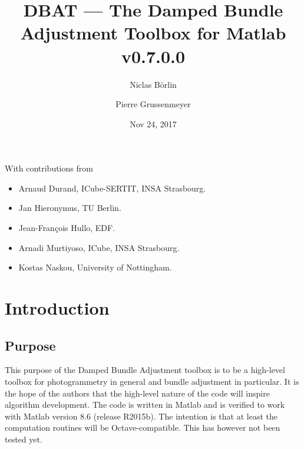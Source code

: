 \documentclass{article}
\begin{document}


\newcommand{\dbatversion}{0.7.0.0}
\newcommand{\dbatdate}{Nov 24, 2017}

\title{DBAT --- The Damped Bundle Adjustment Toolbox for Matlab\\\Large v\dbatversion{}}

\author[1]{Niclas B{\"o}rlin}
\author[2]{Pierre Grussenmeyer}
\date{\dbatdate}

\maketitle

\vfill
With contributions from
\begin{itemize}
\item Arnaud Durand, ICube-SERTIT, INSA Strasbourg.
\item Jan Hieronymus, TU Berlin.
\item Jean-Fran{\c{c}}ois Hullo, EDF.
\item Arnadi Murtiyoso, ICube, INSA Strasbourg.
\item Kostas Naskou, University of Nottingham.
\end{itemize}
\newpage

\tableofcontents

\newpage

\section{Introduction}

\subsection{Purpose}

This purpose of the Damped Bundle Adjustment toolbox is to be a
high-level toolbox for photogrammetry in general and bundle adjustment
in particular. It is the hope of the authors that the high-level
nature of the code will inspire algorithm development. The code is
written in Matlab and is verified to work with Matlab version 8.6
(release R2015b). The intention is that at least the computation
routines will be Octave-compatible. This has however not been tested
yet.
\end{document}
